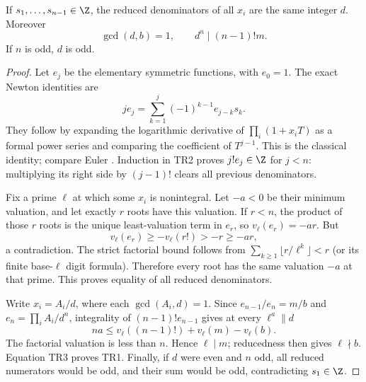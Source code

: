 \begin{theorem}\label{thm:general}
If $s_1,\ldots,s_{n-1}\in\Z$, the reduced denominators of all $x_i$ are the same
integer $d$. Moreover
\[
 \boxed{\gcd(d,b)=1,\qquad d^n\mid(n-1)!m.}                 \tag{TR1}
\]
If $n$ is odd, $d$ is odd.
\end{theorem}
\begin{proof}
Let $e_j$ be the elementary symmetric functions, with $e_0=1$. The exact Newton
identities are
\[
 j e_j=\sum_{k=1}^j(-1)^{k-1}e_{j-k}s_k.                 \tag{TR2}
\]
They follow by expanding the logarithmic derivative of
$\prod_i(1+x_iT)$ as a formal power series and comparing the coefficient of
$T^{j-1}$. This is the classical identity; compare Euler
\cite[\S\S3,5--7]{Euler}. Induction in TR2 proves
$j!e_j\in\Z$ for $j<n$: multiplying its right side by $(j-1)!$ clears all
previous denominators.

Fix a prime $\ell$ at which some $x_i$ is nonintegral. Let $-a<0$ be their
minimum valuation, and let exactly $r$ roots have this valuation. If $r<n$, the
product of those $r$ roots is the unique least-valuation term in $e_r$, so
$v_\ell(e_r)=-ar$. But
\[
 v_\ell(e_r)\ge-v_\ell(r!)>-r\ge-ar,
\]
a contradiction. The strict factorial bound follows from
$\sum_{k\ge1}\lfloor r/\ell^k\rfloor<r$ (or its finite base-$\ell$ digit
formula). Therefore every root has the same valuation $-a$ at that prime.
This proves equality of all reduced denominators.

Write $x_i=A_i/d$, where each $\gcd(A_i,d)=1$. Since
$e_{n-1}/e_n=m/b$ and $e_n=\prod_iA_i/d^n$, integrality of
$(n-1)!e_{n-1}$ gives at every $\ell^a\parallel d$
\[
 na\le v_\ell((n-1)!)+v_\ell(m)-v_\ell(b).              \tag{TR3}
\]
The factorial valuation is less than $n$. Hence $\ell\mid m$; reducedness then
gives $\ell\nmid b$. Equation TR3 proves TR1. Finally, if $d$ were even and
$n$ odd, all reduced numerators would be odd, and their sum would be odd,
contradicting $s_1\in\Z$.
\end{proof}

